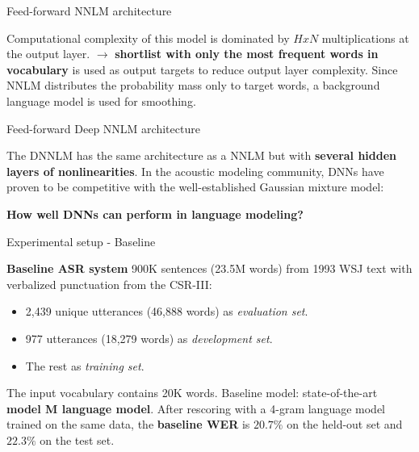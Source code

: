 \documentclass{beamer}
\begin{document}
\begin{frame}{Feed-forward NNLM architecture}


Computational complexity of this model is dominated by $HxN $ multiplications at the output layer.
\newline
\newline
$\rightarrow$ \textbf{shortlist with only the most frequent words in vocabulary} is used as output targets to reduce output layer complexity.
\newline
\newline
Since NNLM distributes the probability mass only to target words, a background language model is used for smoothing.


\end{frame}


\begin{frame}{Feed-forward Deep NNLM architecture}

The DNNLM has the same architecture as a NNLM but with \textbf{several hidden layers of nonlinearities}.
\newline
\newline
In the acoustic modeling community, DNNs have proven to be competitive with the well-established Gaussian mixture model:
\newline
\begin{center}
\textbf{How well DNNs can perform in language modeling?}
\end{center}

\end{frame}


\begin{frame}{Experimental setup - \small{Baseline}}

\textbf{Baseline ASR system}
\newline
\newline
900K sentences (23.5M words) from 1993 WSJ text with verbalized punctuation from the CSR-III: \\
\begin{itemize}
    \item 2,439 unique utterances (46,888 words) as \textit{evaluation set}.
    \item 977 utterances (18,279 words) as \textit{development set}.
    \item The rest as \textit{training set}.\\
\end{itemize}
The input vocabulary contains 20K words.
\newline
\newline
Baseline model: state-of-the-art \textbf{model M language model}.
\newline
\newline
After rescoring with a 4-gram language model trained on the same data, the \textbf{baseline WER} is $20.7\%$ on the held-out set and $22.3\%$ on the test set.

\end{frame}
\end{document}
